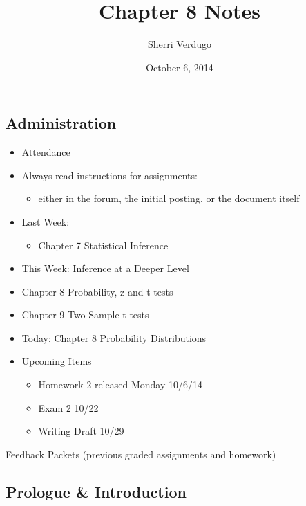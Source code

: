 \documentclass[]{article}
\title{Chapter 8 Notes}
\author{Sherri Verdugo}
\date{October 6, 2014}
\begin{document}
\maketitle


{
\hypersetup{linkcolor=black}
\setcounter{tocdepth}{3}
\tableofcontents
}
\subsection{Administration}\label{administration}

\begin{itemize}
\itemsep1pt\parskip0pt
\item
  Attendance
\item
  Always read instructions for assignments:

  \begin{itemize}
  \itemsep1pt\parskip0pt
  \item
    either in the forum, the initial posting, or the document itself
  \end{itemize}
\item
  Last Week:

  \begin{itemize}
  \itemsep1pt\parskip0pt
  \item
    Chapter 7 Statistical Inference
  \end{itemize}
\item
  This Week: Inference at a Deeper Level
\item
  Chapter 8 Probability, z and t tests
\item
  Chapter 9 Two Sample t-tests
\item
  Today: Chapter 8 Probability Distributions
\item
  Upcoming Items

  \begin{itemize}
  \itemsep1pt\parskip0pt
  \item
    Homework 2 released Monday 10/6/14
  \item
    Exam 2 10/22
  \item
    Writing Draft 10/29
  \end{itemize}
\end{itemize}

Feedback Packets (previous graded assignments and homework)

\subsection{Prologue \& Introduction}\label{prologue-introduction}
\end{document}
